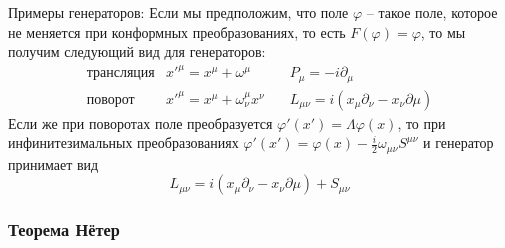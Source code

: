 \documentclass[a4paper,12pt]{article}
\theoremstyle{definition}
\theoremstyle{definition}
\theoremstyle{definition}
\begin{document}
Примеры генераторов:
Если мы предположим, что поле $\varphi$ -- такое поле, которое не меняется при конформных преобразованиях, то есть $F(\varphi)=\varphi$, то мы получим следующий вид для генераторов:
\begin{eqnarray}
  \label{eq:169}
  \mbox{трансляция}  & x'^{\mu}=x^{\mu}+\omega^{\mu}& \quad P_{\mu}=-i\partial_{\mu}\\
  \mbox{поворот} & x'^{\mu}=x^{\mu}+\omega^{\mu}_{\nu}x^{\nu} & \quad L_{\mu\nu}=i(x_{\mu}\partial_{\nu}-x_{\nu}\partial{\mu})
\end{eqnarray}
Если же при поворотах поле преобразуется $\varphi'(x')=\Lambda\varphi(x)$, то при инфинитезимальных преобразованиях $\varphi'(x')=\varphi(x)-\frac{i}{2}\omega_{\mu\nu}S^{\mu\nu}$ и генератор принимает вид
\begin{equation*}
  L_{\mu\nu}=i(x_{\mu}\partial_{\nu}-x_{\nu}\partial{\mu})+S_{\mu\nu}
\end{equation*}

\subsubsection*{Теорема Нётер}
\label{sec:noether}
\end{document}
